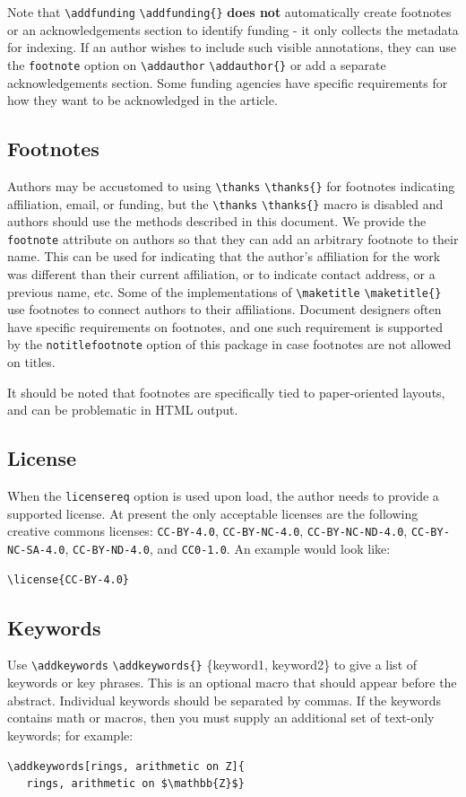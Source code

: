 \documentclass{article}
\newcommand{\cmd}[2][]{%
  \def\FirstArg{#1}%
  \ifx\FirstArg\empty%
    \texttt{\textbackslash{}#2}%
  \else%
    \texttt{\textbackslash{}#2\{#1\}}%
  \fi
}
\begin{document}
Note that \cmd{addfunding} \textbf{does not} automatically create footnotes or
an acknowledgements section to identify funding - it only collects the
metadata for indexing. If an author wishes to include such visible
annotations, they can use the \texttt{footnote} option on
\cmd{addauthor} or add a separate
acknowledgements section. Some funding agencies have specific
requirements for how they want to be acknowledged in the article.

\subsection{Footnotes}\label{footnotes}
Authors may be accustomed to using \cmd{thanks} for footnotes
indicating affiliation, email, or funding, but the
\cmd{thanks} macro is disabled and authors should use the methods described
in this document.  We provide the \texttt{footnote} attribute on
authors so that they can add an arbitrary footnote to their name.
This can be used for indicating that the author's affiliation for the
work was different than their current affiliation, or to indicate
contact address, or a previous name, etc.  Some of the implementations
of \cmd{maketitle} use footnotes to connect authors to their affiliations.
Document designers often have specific requirements on footnotes, and one such
requirement is supported by the \texttt{notitlefootnote} option of
this package in case footnotes are not allowed on titles.

It should be noted that footnotes are specifically tied to paper-oriented
layouts, and can be problematic in HTML output.
\subsection{License}\label{license}
When the \texttt{licensereq} option is used upon load, the author needs
to provide a supported license.   At present the only
acceptable licenses are the following creative commons licenses:
\texttt{CC-BY-4.0},
\texttt{CC-BY-NC-4.0},
\texttt{CC-BY-NC-ND-4.0},
\texttt{CC-BY-NC-SA-4.0},
\texttt{CC-BY-ND-4.0},
and \texttt{CC0-1.0}.
An example would look like:

\begin{verbatim}
\license{CC-BY-4.0}
\end{verbatim}

\subsection{Keywords}
Use \cmd{addkeywords}\{keyword1, keyword2\} to give a
list of keywords or key phrases. This is an optional macro that should
appear before the abstract.  Individual keywords should be separated
by commas. If the keywords contains math or macros, then you must supply an additional set of
text-only keywords; for example:
\begin{verbatim}
\addkeywords[rings, arithmetic on Z]{
   rings, arithmetic on $\mathbb{Z}$}
\end{verbatim}
\end{document}
